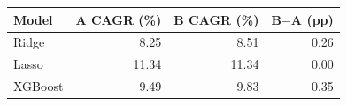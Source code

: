 \begin{tabular}{lrrr}
\toprule
Model & A CAGR (\%) & B CAGR (\%) & B$-$A (pp) \\
\midrule
Ridge & 8.25 & 8.51 & 0.26 \\
Lasso & 11.34 & 11.34 & 0.00 \\
XGBoost & 9.49 & 9.83 & 0.35 \\
\bottomrule
\end{tabular}
